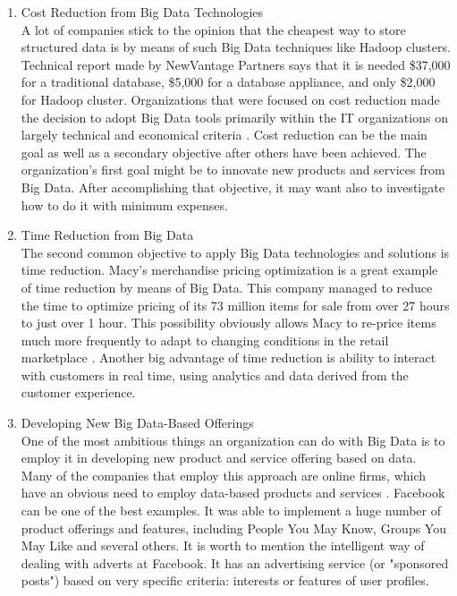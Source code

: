 \documentclass[runningheads]{llncs}
\begin{document}
\begin{enumerate}
\item Cost Reduction from Big Data Technologies\\

A lot of companies stick to the opinion that the cheapest way to store structured data is by means of such Big Data techniques like Hadoop clusters. Technical report \cite{NEWVANTAGE} made by NewVantage Partners says that it is needed \$37,000 for a traditional database, \$5,000 for a database appliance, and only \$2,000 for Hadoop cluster. Organizations that were focused on cost reduction made the decision to adopt Big Data tools primarily within the IT organizations on largely technical and economical criteria \cite{DAVENPORT}. Cost reduction can be the main goal as well as a secondary objective after others have been achieved. The organization's first goal might be to innovate new products and services from Big Data. After accomplishing that objective, it may want also to investigate how to do it with minimum expenses.\\

\item Time Reduction from Big Data\\

The second common objective to apply Big Data technologies and solutions is time reduction. Macy's merchandise pricing optimization is a great example of time reduction by means of Big Data. This company managed to reduce the time to optimize pricing of its 73 million items for sale from over 27 hours to just over 1 hour. This possibility obviously allows Macy to re-price items much more frequently to adapt to changing conditions in the retail marketplace \cite{DAVENPORT}. Another big advantage of time reduction is ability to interact with customers in real time, using analytics and data derived from the customer experience.\\

\item Developing New Big Data-Based Offerings\\

One of the most ambitious things an organization can do with Big Data is to employ it in developing new product and service offering based on data. Many of the companies that employ this approach are online firms, which have an obvious need to employ data-based products and services \cite{DAVENPORT}. Facebook can be one of the best examples. It was able to implement a huge number of product offerings and features, including People You May Know, Groups You May Like and several others. It is worth to mention the intelligent way of dealing with adverts at Facebook. It has an advertising service (or "sponsored posts") based on very specific criteria: interests or features of user profiles. 


\end{enumerate}
\end{document}

